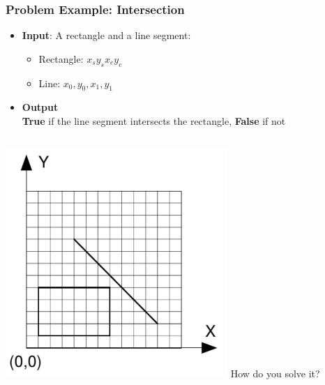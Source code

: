 \begin{frame}
  \frametitle{Problem Example: Intersection}
    \begin{block}{}
      \begin{itemize}
      \item {\bf Input}: A rectangle and a line segment:
        \begin{itemize}
          \item Rectangle: $x_s y_s x_e y_e$
          \item Line: $x_0, y_0, x_1, y_1$
        \end{itemize}

      \item {\bf Output}\\
        {\bf True} if the line segment intersects the rectangle, {\bf False} if not
      \end{itemize}
    \end{block}
    \begin{columns}
      \includegraphics[width=.9\textwidth]{img/intersection_uva}
      How do you solve it?
    \end{columns}

\end{frame}

